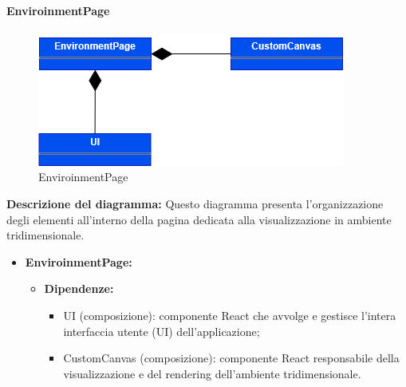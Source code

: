 \paragraph{EnviroinmentPage}
\begin{figure}[h!] \centering
    \includegraphics[scale=0.45]{template/images/uml_front/ui/envpage.png}
    \caption{EnviroinmentPage}
\end{figure}
\textbf{Descrizione del diagramma:}
Questo diagramma presenta l'organizzazione degli elementi all'interno della pagina dedicata alla visualizzazione in ambiente tridimensionale.
\begin{itemize}
    \item \textbf{EnviroinmentPage:}
    \begin{itemize}
        \item \textbf{Dipendenze:}
        \begin{itemize}
            \item UI (composizione): componente React che avvolge e gestisce l'intera interfaccia utente (UI) dell'applicazione;
            \item CustomCanvas (composizione): componente React responsabile della visualizzazione e del rendering dell'ambiente tridimensionale.
        \end{itemize} 
    \end{itemize}
\end{itemize}

